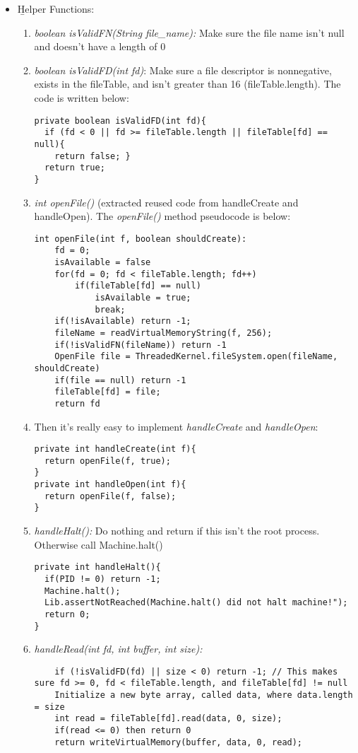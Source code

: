 \documentclass{article}
\begin{document}
\begin{itemize}
\item \b{Helper Functions:}
\begin{enumerate}
\item \textit{boolean isValidFN(String file\_name):} Make sure the file name isn't null and doesn't have a length of 0
\item \textit{boolean isValidFD(int fd)}: Make sure a file descriptor is nonnegative, exists in the fileTable, and isn't greater than 16 (fileTable.length). The code is written below:
\begin{verbatim}
private boolean isValidFD(int fd){
  if (fd < 0 || fd >= fileTable.length || fileTable[fd] == null){
    return false; }
  return true;
}
\end{verbatim}

\item \textit{int openFile()} (extracted reused code from handleCreate and handleOpen). The \textit{openFile()} method pseudocode is below: 
\begin{verbatim}
int openFile(int f, boolean shouldCreate):
    fd = 0;
    isAvailable = false
    for(fd = 0; fd < fileTable.length; fd++)
        if(fileTable[fd] == null)
            isAvailable = true;
            break;
    if(!isAvailable) return -1;
    fileName = readVirtualMemoryString(f, 256);
    if(!isValidFN(fileName)) return -1
    OpenFile file = ThreadedKernel.fileSystem.open(fileName, shouldCreate)
    if(file == null) return -1
    fileTable[fd] = file;
    return fd
\end{verbatim}
\item Then it's really easy to implement \textit{handleCreate} and \textit{handleOpen}:
\begin{verbatim}
private int handleCreate(int f){
  return openFile(f, true);  
}
private int handleOpen(int f){
  return openFile(f, false); 
}
\end{verbatim}

\item \textit{handleHalt():} Do nothing and return if this isn't the root process. Otherwise call Machine.halt()
\begin{verbatim}
private int handleHalt(){
  if(PID != 0) return -1;
  Machine.halt();
  Lib.assertNotReached(Machine.halt() did not halt machine!");
  return 0;
}
\end{verbatim}

\item \textit{handleRead(int fd, int buffer, int size):} 
\begin{verbatim}
    if (!isValidFD(fd) || size < 0) return -1; // This makes sure fd >= 0, fd < fileTable.length, and fileTable[fd] != null
    Initialize a new byte array, called data, where data.length = size
    int read = fileTable[fd].read(data, 0, size);
    if(read <= 0) then return 0
    return writeVirtualMemory(buffer, data, 0, read);
\end{verbatim}


\end{enumerate}
\end{itemize}
\end{document}
